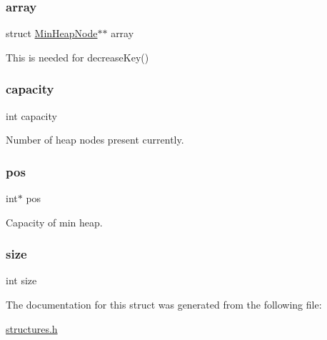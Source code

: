 \subsubsection{\texorpdfstring{array}{array}}
{\footnotesize\ttfamily struct \mbox{\hyperlink{struct_min_heap_node}{Min\+Heap\+Node}}$\ast$$\ast$ array}



This is needed for decrease\+Key() 

\mbox{\label{struct_min_heap_adbe66a087ac3fd4a5b0566f64ca2d12b}} 
\subsubsection{\texorpdfstring{capacity}{capacity}}
{\footnotesize\ttfamily int capacity}



Number of heap nodes present currently. 

\mbox{\label{struct_min_heap_a04b54efc5a27053402ab5c4642c50200}} 
\subsubsection{\texorpdfstring{pos}{pos}}
{\footnotesize\ttfamily int$\ast$ pos}



Capacity of min heap. 

\mbox{\label{struct_min_heap_a439227feff9d7f55384e8780cfc2eb82}} 
\subsubsection{\texorpdfstring{size}{size}}
{\footnotesize\ttfamily int size}



The documentation for this struct was generated from the following file\+:\begin{DoxyCompactItemize}
\item 
\mbox{\hyperlink{structures_8h}{structures.\+h}}\end{DoxyCompactItemize}
